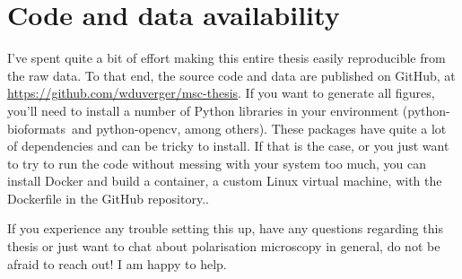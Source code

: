 \chapter{Code and data availability}

I've spent quite a bit of effort making this entire thesis easily reproducible from the raw data. To that end, the source code and data are published on GitHub, at \url{https://github.com/wduverger/msc-thesis}. If you want to generate all figures, you'll need to install a number of Python libraries in your environment (\ttfamily python-bioformats\rmfamily\ and \ttfamily python-opencv\rmfamily, among others). These packages have quite a lot of dependencies and can be tricky to install. If that is the case, or you just want to try to run the code without messing with your system too much, you can install Docker and build a container, a custom Linux virtual machine, with the Dockerfile in the GitHub repository.. 

If you experience any trouble setting this up, have any questions regarding this thesis or just want to chat about polarisation microscopy in general, do not be afraid to reach out! I am happy to help.